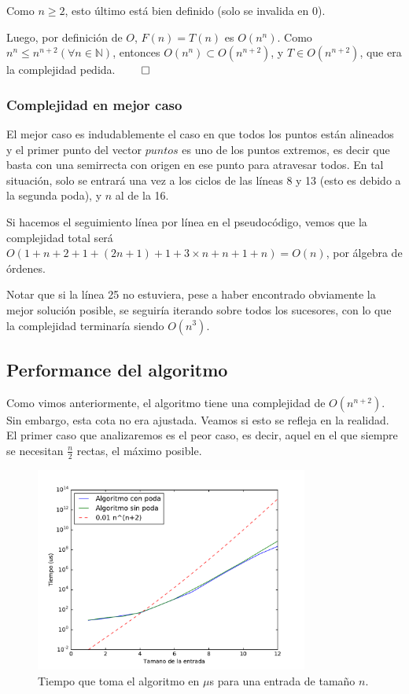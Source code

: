   Como $n \geq 2$, esto último está bien definido (solo se invalida en 0).

  Luego, por definición de $O$, $F(n) = T(n)$ es $O(n^n)$. Como $n^n\leq n^{n+2} (\forall n \in \mathbb{N})$, entonces $O(n^n)\subset O(n^{n+2})$, y $T\in O(n^{n+2})$, que era la complejidad pedida. $\qed$

\subsubsection{Complejidad en mejor caso}

El mejor caso es indudablemente el caso en que todos los puntos están alineados y el primer punto del vector $puntos$ es uno de los puntos extremos, es decir que basta con una semirrecta con origen en ese punto para atravesar todos. En tal situación, solo se entrará una vez a los ciclos de las líneas 8 y 13 (esto es debido a la segunda poda), y $n$ al de la 16.

Si hacemos el seguimiento línea por línea en el pseudocódigo, vemos que la complejidad total será $O(1+n+2+1+(2n+1)+1+3\times n+n+1+n) = O(n)$, por álgebra de órdenes.

Notar que si la línea 25 no estuviera, pese a haber encontrado obviamente la mejor solución posible, se seguiría iterando sobre todos los sucesores, con lo que la complejidad terminaría siendo $O(n^3)$. 

\subsection{Performance del algoritmo}

Como vimos anteriormente, el algoritmo tiene una complejidad de $O(n^{n+2})$. Sin embargo, esta cota no era ajustada. Veamos si esto se refleja en la realidad. El primer caso que analizaremos es el peor caso, es decir, aquel en el que siempre se necesitan $\frac{n}{2}$ rectas, el máximo posible.

\begin{figure}[H]
 \centering
	\includegraphics[width=0.8\textwidth]{img/tiempos/kamehameha1.pdf}
	\caption{\footnotesize Tiempo que toma el algoritmo en $\mu$s para una entrada de tamaño $n$.}
	\label{fig:kamehameha-tiempos1}
\end{figure}

